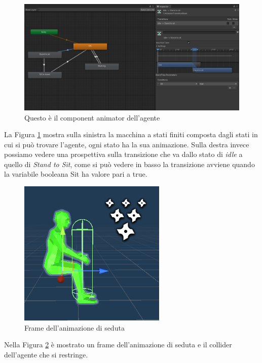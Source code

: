 \documentclass[12pt, openany]{book}
\begin{document}
\begin{figure}
	\centering
	\includegraphics[width=1.2\linewidth]{"Immagini/AgentAnimator.png"}
	\caption{Questo è il component animator dell'agente}
	\label{fig:AgentAnimator}
\end{figure}
La Figura \ref{fig:AgentAnimator} mostra sulla sinistra la macchina a stati finiti composta dagli stati in cui si può trovare l'agente, ogni stato ha la sua animazione. Sulla destra invece possiamo vedere una prospettiva sulla transizione che va dallo stato di \emph{idle} a quello di \emph{Stand to Sit}, come si può vedere in basso la transizione avviene quando la variabile booleana Sit ha valore pari a true.\\
\begin{figure}[H]
	\centering
	\includegraphics[width=0.8\linewidth]{"Immagini/seduto.png"}
	\caption{Frame dell'animazione di seduta}
	\label{fig:Seduta}
\end{figure}
Nella Figura \ref{fig:Seduta} è mostrato un frame dell'animazione di seduta e il collider dell'agente che si restringe.
\end{document}
